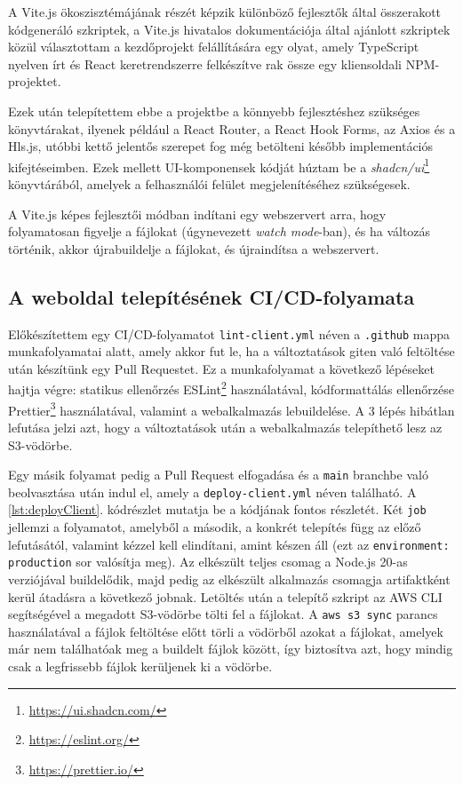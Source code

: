A Vite.js ökoszisztémájának részét képzik különböző fejlesztők által összerakott kódgeneráló szkriptek, a Vite.js hivatalos dokumentációja által ajánlott szkriptek közül választottam a kezdőprojekt felállítására egy olyat, amely TypeScript nyelven írt és React keretrendszerre felkészítve rak össze egy kliensoldali NPM-projektet.

Ezek után telepítettem ebbe a projektbe a könnyebb fejlesztéshez szükséges könyvtárakat, ilyenek például a React Router, a React Hook Forms, az Axios és a Hls.js, utóbbi kettő jelentős szerepet fog még betölteni később implementációs kifejtéseimben. Ezek mellett UI-komponensek kódját húztam be a \emph{shadcn/ui}\footnote{\url{https://ui.shadcn.com/}} könyvtárából, amelyek a felhasználói felület megjelenítéséhez szükségesek.

A Vite.js képes fejlesztői módban indítani egy webszervert arra, hogy folyamatosan figyelje a fájlokat (úgynevezett \emph{watch mode}-ban), és ha változás történik, akkor újrabuildelje a fájlokat, és újraindítsa a webszervert.

\subsection{A weboldal telepítésének CI/CD-folyamata}

Előkészítettem egy CI/CD-folyamatot \verb|lint-client.yml| néven a \verb|.github| mappa munkafolyamatai alatt, amely akkor fut le, ha a változtatások giten való feltöltése után készítünk egy Pull Requestet. Ez a munkafolyamat a következő lépéseket hajtja végre: statikus ellenőrzés ESLint\footnote{\url{https://eslint.org/}} használatával, kódformattálás ellenőrzése Prettier\footnote{\url{https://prettier.io/}} használatával, valamint a webalkalmazás lebuildelése. A 3 lépés hibátlan lefutása jelzi azt, hogy a változtatások után a webalkalmazás telepíthető lesz az S3-vödörbe.

Egy másik folyamat pedig a Pull Request elfogadása és a \verb|main| branchbe való beolvasztása után indul el, amely a \verb|deploy-client.yml| néven található. A \ref{lst:deployClient}. kódrészlet mutatja be a kódjának fontos részletét. Két \verb|job| jellemzi a folyamatot, amelyből a második, a konkrét telepítés függ az előző lefutásától, valamint kézzel kell elindítani, amint készen áll (ezt az \verb|environment: production| sor valósítja meg). Az elkészült teljes csomag a Node.js 20-as verziójával buildelődik, majd pedig az elkészült alkalmazás csomagja artifaktként kerül átadásra a következő jobnak. Letöltés után a telepítő szkript az AWS CLI segítségével a megadott S3-vödörbe tölti fel a fájlokat. A \verb|aws s3 sync| parancs használatával a fájlok feltöltése előtt törli a vödörből azokat a fájlokat, amelyek már nem találhatóak meg a buildelt fájlok között, így biztosítva azt, hogy mindig csak a legfrissebb fájlok kerüljenek ki a vödörbe.

